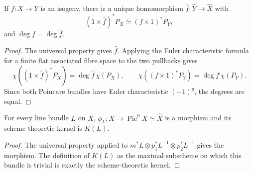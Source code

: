 \begin{corollary}
\label{mumford-cor-dual-isogeny-degree}
If $f:X\to Y$ is an isogeny, there is a unique homomorphism
$\widehat f:\widehat Y\to\widehat X$ with
\[
(1\times\widehat f)^*P_X\simeq(f\times1)^*P_Y,
\]
and $\deg f=\deg\widehat f$.
\end{corollary}
\begin{proof}
The universal property gives $\widehat f$. Applying the Euler
characteristic formula for a finite flat associated fibre space to the two
pullbacks gives
\[
\chi((1\times\widehat f)^*P_X)=\deg\widehat f\,\chi(P_X),\qquad
\chi((f\times1)^*P_Y)=\deg f\,\chi(P_Y).
\]
Since both Poincare bundles have Euler characteristic $(-1)^g$, the degrees
are equal.
\end{proof}

\begin{corollary}
\label{mumford-cor-line-bundle-morphism}
\label{mumford-prop-phi-L}
For every line bundle $L$ on $X$, $\phi_L:X\to\operatorname{Pic}^0X\simeq
\widehat X$ is a morphism and its scheme-theoretic kernel is $K(L)$.
\end{corollary}
\begin{proof}
The universal property applied to
$m^*L\otimes p_1^*L^{-1}\otimes p_2^*L^{-1}$ gives the morphism. The
definition of $K(L)$ as the maximal subscheme on which this bundle is
trivial is exactly the scheme-theoretic kernel.
\end{proof}


